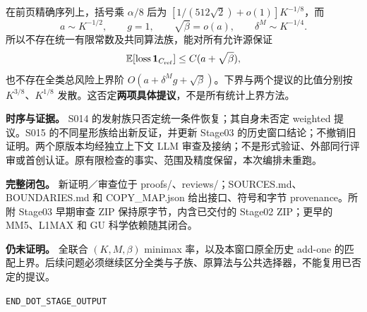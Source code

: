 \documentclass[11pt,a4paper]{article}
\begin{document}
在前页精确序列上，括号乘 $\alpha/8$ 后为
$[1/(512\sqrt2)+o(1)]K^{-1/8}$，而
\[
 a\sim K^{-1/2},\qquad g=1,\qquad \sqrt\beta=o(a),\qquad
 \delta^M\sim K^{-1/4}.
\]
所以不存在统一有限常数及共同算法族，能对所有允许源保证
\[
 \mathbb E[\mathrm{loss}\,\mathbf1_{C_{\rm ref}}]\le C(a+\sqrt\beta),
\]
也不存在全类总风险上界阶 $O(a+\delta^M g+\sqrt\beta)$。下界与两个提议的比值分别按 $K^{3/8}$、$K^{1/8}$ 发散。这否定\textbf{两项具体提议}，不是所有统计上界方法。

\textbf{时序与证据。} S014 的发射族只否定统一条件恢复；其自身未否定 weighted 提议。S015 的不同星形族给出新反证，并更新 Stage03 的历史窗口结论；不撤销旧证明。两个原版本均经独立上下文 LLM 审查及接纳；不是形式验证、外部同行评审或首创认证。原有限检查的事实、范围及精度保留，本次编排未重跑。

\textbf{完整闭包。} 新证明／审查位于 proofs/、reviews/；SOURCES.md、BOUNDARIES.md 和 COPY\_MAP.json 给出接口、符号和字节 provenance。所附 Stage03 早期审查 ZIP 保持原字节，内含已交付的 Stage02 ZIP；更早的 MM5、L1MAX 和 GU 科学依赖随其闭合。

\textbf{仍未证明。} 全联合 $(K,M,\beta)$ minimax 率，以及本窗口原全历史 add-one 的匹配上界。后续问题必须继续区分全类与子族、原算法与公共选择器，不能复用已否定的提议。

\texttt{END\_DOT\_STAGE\_OUTPUT}
\end{document}
